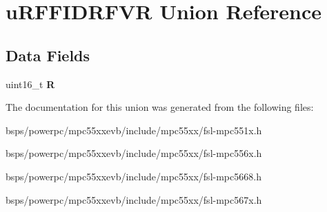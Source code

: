 \hypertarget{unionuRFFIDRFVR}{}\section{u\+R\+F\+F\+I\+D\+R\+F\+VR Union Reference}
\label{unionuRFFIDRFVR}
\subsection*{Data Fields}
\begin{DoxyCompactItemize}
\item 
\mbox{\label{unionuRFFIDRFVR_a7988e2b9bf811e6a75f12f57e2793957}} 
uint16\+\_\+t {\bfseries R}
\end{DoxyCompactItemize}


The documentation for this union was generated from the following files\+:\begin{DoxyCompactItemize}
\item 
bsps/powerpc/mpc55xxevb/include/mpc55xx/fsl-\/mpc551x.\+h\item 
bsps/powerpc/mpc55xxevb/include/mpc55xx/fsl-\/mpc556x.\+h\item 
bsps/powerpc/mpc55xxevb/include/mpc55xx/fsl-\/mpc5668.\+h\item 
bsps/powerpc/mpc55xxevb/include/mpc55xx/fsl-\/mpc567x.\+h\end{DoxyCompactItemize}
